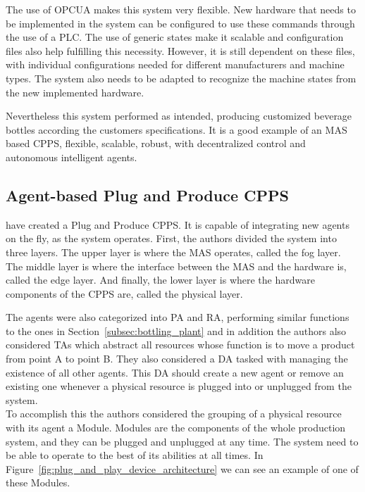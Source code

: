 The use of \gls{OPCUA} makes this system very flexible. New hardware that needs to be implemented in the system can be configured to use these commands through the use of a \gls{PLC}. The use of generic states make it scalable and configuration files also help fulfilling this necessity. However, it is still dependent on these files, with individual configurations needed for different manufacturers and machine types. The system also needs to be adapted to recognize the machine states from the new implemented hardware.

Nevertheless this system performed as intended, producing customized beverage bottles according the customers specifications. It is a good example of an \gls{MAS} based \gls{CPPS}, flexible, scalable, robust, with decentralized control and autonomous intelligent agents.
 
\subsection{Agent-based Plug and Produce CPPS}
\label{agent_plug_and_produce}

\citeauthor{8972169} \cite{8972169} have created a Plug and Produce \gls{CPPS}. It is capable of integrating new agents on the fly, as the system operates. First, the authors divided the system into three layers. The upper layer is where the \gls{MAS} operates, called the fog layer. The middle layer is where the interface between the \gls{MAS} and the hardware is, called the edge layer. And finally, the lower layer is where the hardware components of the \gls{CPPS} are, called the physical layer.\\


The agents were also categorized into \gls{PA} and \gls{RA}, performing similar functions to the ones in Section~\ref{subsec:bottling_plant} and in addition the authors also considered \gls{TA}s which abstract all resources whose function is to move a product from point A to point B. They also considered a \gls{DA} tasked with managing the existence of all other agents. This \gls{DA} should create a new agent or remove an existing one whenever a physical resource is plugged into or unplugged from the system.\\

To accomplish this the authors considered the grouping of a physical resource with its agent a Module. Modules are the components of the whole production system, and they can be plugged and unplugged at any time. The system need to be able to operate to the best of its abilities at all times. In Figure~\ref{fig:plug_and_play_device_architecture} we can see an example of one of these Modules.\\

